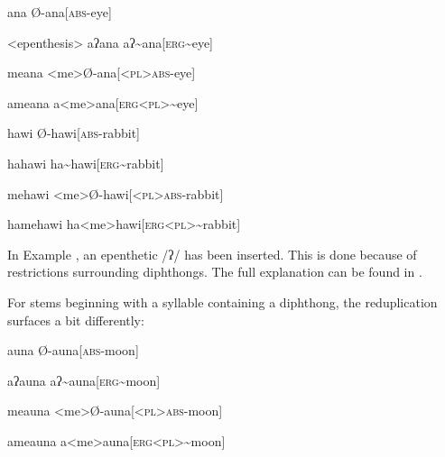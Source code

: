 \begin{paracol}{2}
\a
\begingl
\glpreamble ana
\endpreamble
Ø-ana[\textsc{abs-}eye]
\endgl
\switchcolumn

\a<epenthesis>
\begingl
\glpreamble aʔana
\endpreamble
aʔ\textasciitilde ana[\textsc{erg\textasciitilde }eye]
\endgl
\switchcolumn

\a
\begingl
\glpreamble meana
\endpreamble
<me>Ø-ana[\textsc{<pl>abs-}eye]
\endgl
\switchcolumn

\a
\begingl
\glpreamble ameana
\endpreamble
a<me>ana[\textsc{erg<pl>\textasciitilde}eye]
\endgl
\xe
\end{paracol}
\begin{paracol}{2}
\pex
\a
\begingl
\glpreamble hawi
\endpreamble
Ø-hawi[\textsc{abs-}rabbit]
\endgl
\switchcolumn

\a
\begingl
\glpreamble hahawi
\endpreamble
ha\textasciitilde hawi[\textsc{erg\textasciitilde }rabbit]
\endgl
\switchcolumn

\a
\begingl
\glpreamble mehawi
\endpreamble
<me>Ø-hawi[\textsc{<pl>abs-}rabbit]
\endgl
\switchcolumn

\a
\begingl
\glpreamble hamehawi
\endpreamble
ha<me>hawi[\textsc{erg<pl>\textasciitilde}rabbit]
\endgl
\xe
\end{paracol}

In Example , an epenthetic /ʔ/ has been inserted. This is done because of restrictions surrounding diphthongs. The full explanation can be found in .

For stems beginning with a syllable containing a diphthong, the reduplication surfaces a bit differently:

\begin{paracol}{2}
\pex
\a
\begingl
\glpreamble auna
\endpreamble
Ø-auna[\textsc{abs-}moon]
\endgl
\switchcolumn

\a
\begingl
\glpreamble aʔauna
\endpreamble
aʔ\textasciitilde auna[\textsc{erg\textasciitilde }moon]
\endgl
\switchcolumn

\a
\begingl
\glpreamble meauna
\endpreamble
<me>Ø-auna[\textsc{<pl>abs-}moon]
\endgl
\switchcolumn

\a
\begingl
\glpreamble ameauna
\endpreamble
a<me>auna[\textsc{erg<pl>\textasciitilde}moon]
\endgl
\xe
\end{paracol}

